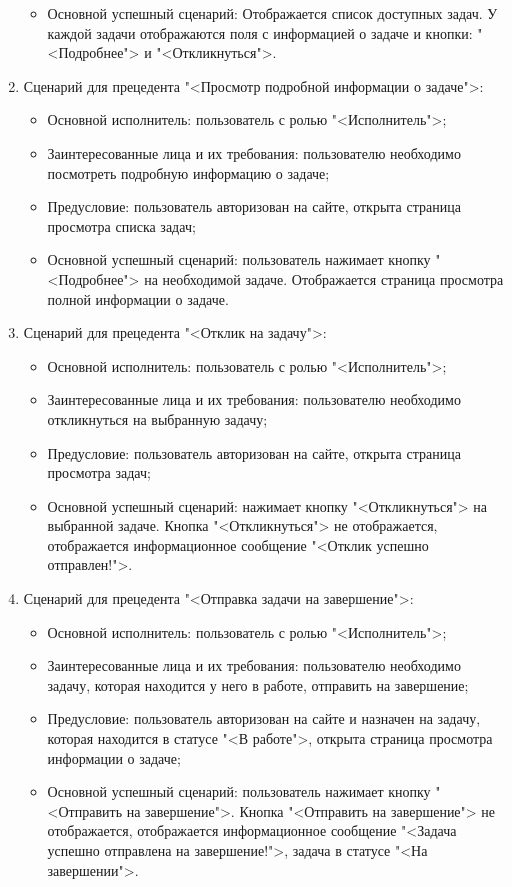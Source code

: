 \begin{enumerate}
\begin{itemize}
		\item Основной успешный сценарий: Отображается список доступных задач. У каждой задачи отображаются поля с информацией о задаче и кнопки: "<Подробнее"> и "<Откликнуться">.
	\end{itemize}
\item Сценарий для прецедента "<Просмотр подробной информации о задаче">:
	\begin{itemize}
		\item Основной исполнитель: пользователь с ролью "<Исполнитель">;
		\item Заинтересованные лица и их требования: пользователю необходимо посмотреть подробную информацию о задаче;
		\item Предусловие: пользователь авторизован на сайте, открыта страница просмотра списка задач;
		\item Основной успешный сценарий: пользователь нажимает кнопку "<Подробнее"> на необходимой задаче. Отображается страница просмотра полной информации о задаче.
	\end{itemize}
\item Сценарий для прецедента "<Отклик на задачу">:
	\begin{itemize}
		\item Основной исполнитель: пользователь с ролью "<Исполнитель">;
		\item Заинтересованные лица и их требования: пользователю необходимо откликнуться на выбранную задачу;
		\item Предусловие: пользователь авторизован на сайте, открыта страница просмотра задач;
		\item Основной успешный сценарий: нажимает кнопку "<Откликнуться"> на выбранной задаче. Кнопка "<Откликнуться"> не отображается, отображается информационное сообщение "<Отклик успешно отправлен!">.
	\end{itemize}
\item Сценарий для прецедента "<Отправка задачи на завершение">:
	\begin{itemize}
		\item Основной исполнитель: пользователь с ролью "<Исполнитель">;
		\item Заинтересованные лица и их требования: пользователю необходимо задачу, которая находится у него в работе, отправить на завершение;
		\item Предусловие: пользователь авторизован на сайте и назначен на задачу, которая находится в статусе "<В работе">, открыта страница просмотра информации о задаче;
		\item Основной успешный сценарий: пользователь нажимает кнопку "<Отправить на завершение">. Кнопка "<Отправить на завершение"> не отображается, отображается информационное сообщение "<Задача успешно отправлена на завершение!">, задача в статусе "<На завершении">.

\end{itemize}
\end{enumerate}
